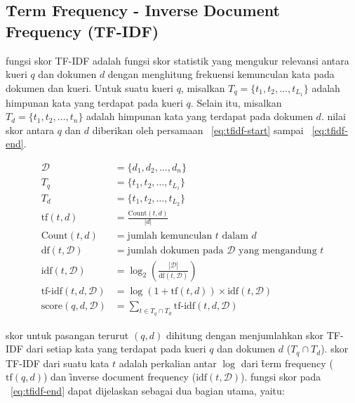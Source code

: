    \subsection{\f{Term Frequency - Inverse Document Frequency} (TF-IDF)}
    \label{sec:tfidf}

    fungsi skor TF-IDF adalah fungsi skor statistik yang mengukur relevansi antara kueri $q$ dan dokumen $d$ dengan menghitung frekuensi kemunculan kata pada dokumen dan kueri. Untuk suatu kueri $q$, misalkan $T_q= \{t_1, t_2, \dots, t_{L_1}\}$ adalah himpunan kata yang terdapat pada kueri $q$. Selain itu, misalkan $T_d = \{t_1, t_2, \dots, t_n\}$ adalah himpunan kata yang terdapat pada dokumen $d$. nilai skor antara $q$ dan $d$ diberikan oleh persamaan \equ~\ref{eq:tfidf-start} sampai \equ~\ref{eq:tfidf-end}.

    \begin{align}
        \label{eq:tfidf-start}
        \mathcal{D} &= \{d_1, d_2, \dots, d_n\} \\
        T_q &= \{t_1, t_2, \dots, t_{L_1}\} \\
        T_d &= \{t_1, t_2, \dots, t_{L_2}\} \\
        \text{tf}(t, d) &= \frac{\text{Count}(t, d)}{|d|} \\
        \text{Count}(t, d) &= \text{jumlah kemunculan } t \text{ dalam } d \\
        \text{df}(t, \mathcal{D}) &= \text{jumlah dokumen pada } \mathcal{D} \text{ yang mengandung } t \\
        \text{idf}(t, \mathcal{D}) &= \log_2\left(\frac{|\mathcal{D}|}{\text{df}(t, \mathcal{D})}\right) \\
        \text{tf-idf}(t, d, \mathcal{D}) &= \log(1 + \text{tf}(t, d)) \times \text{idf}(t, \mathcal{D}) \\
        \label{eq:tfidf-end}
        \text{score}(q,d,\mathcal{D}) &= \sum_{t \in T_q \cap T_d} \text{tf-idf}(t, d, \mathcal{D})
    \end{align}

    skor untuk pasangan terurut $(q,d)$ dihitung dengan menjumlahkan skor TF-IDF dari setiap kata yang terdapat pada kueri $q$ dan dokumen $d$ ($T_q \cap T_d$). skor TF-IDF dari suatu kata $t$ adalah perkalian antar $\log$ dari \f{term frequency} ($\text{tf}(q,d)$) dan \f{inverse document frequency} ($\text{idf}(t,\mathcal{D})$). fungsi skor pada \equ~\ref{eq:tfidf-end} dapat dijelaskan sebagai dua bagian utama, yaitu:

